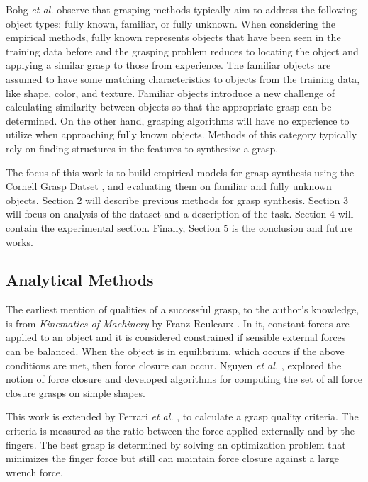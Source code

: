 \documentclass{article}
\begin{document}
Bohg \textit{et al.} \cite{bohg14} observe that grasping methods typically aim
to address the following object types: fully known, familiar, or fully unknown.
When considering the empirical methods, fully known represents objects that
have been seen in the training data before and the grasping problem reduces to
locating the object and applying a similar grasp to those from experience.
The familiar objects are assumed to have some matching characteristics to objects
from the training data, like shape, color, and texture. Familiar objects
introduce a new challenge of calculating similarity between objects so that
the appropriate grasp can be determined. On the other hand, grasping algorithms
will have no experience to utilize when approaching fully known objects. Methods
of this category typically rely on finding structures in the features to
synthesize a grasp.

The focus of this work is to build empirical models for grasp synthesis using
the Cornell Grasp Datset \cite{lenz15}, and evaluating them on familiar and
fully unknown objects. Section 2 will describe previous methods for grasp
synthesis. Section 3 will focus on analysis of the dataset and a description
of the task. Section 4 will contain the experimental section. Finally, Section
5 is the conclusion and future works.

\subsection{Analytical Methods}
The earliest mention of qualities of a successful grasp, to the author's
knowledge, is from \textit{Kinematics of Machinery} by Franz Reuleaux
\cite{reuleaux74}.
In it, constant forces are applied to an object and it is considered
constrained if sensible external forces can be balanced. When the
object is in equilibrium, which occurs if the above conditions are
met, then force closure can occur. Nguyen \textit{et al.} \cite{nguyen86},
explored the notion of force closure and developed algorithms for computing
the set of all force closure grasps on simple shapes.

This work is extended by Ferrari \textit{et al.} \cite{ferrari92}, to calculate
a grasp quality criteria. The criteria is measured as the ratio between the force
applied externally and by the fingers. The best grasp is determined by solving
an optimization problem that minimizes the finger force but still can maintain
force closure against a large wrench force.
\end{document}
